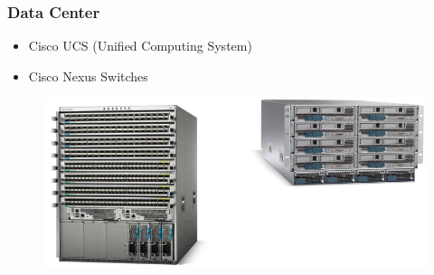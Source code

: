 \documentclass[pdflatex,compress,mathserif]{beamer}
\begin{document}
\begin{frame}
	\frametitle{Data Center}
	\begin{itemize}
		\item Cisco UCS (Unified Computing System)
		\item Cisco Nexus Switches
	\end{itemize}
	\begin{figure}
		\centering
		\includegraphics[width=\linewidth]{img/img38}
	\end{figure}
\end{frame}
\end{document}
